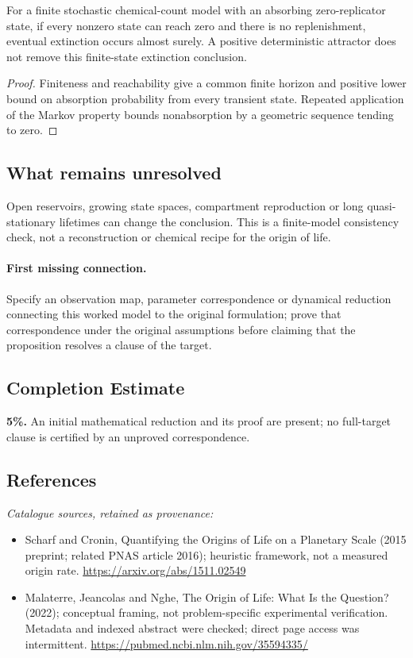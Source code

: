 \documentclass[11pt]{article}
\begin{document}
\begin{proposition}
For a finite stochastic chemical-count model with an absorbing zero-replicator state, if every nonzero state can reach zero and there is no replenishment, eventual extinction occurs almost surely. A positive deterministic attractor does not remove this finite-state extinction conclusion.
\end{proposition}
\begin{proof}
Finiteness and reachability give a common finite horizon and positive lower bound on absorption probability from every transient state. Repeated application of the Markov property bounds nonabsorption by a geometric sequence tending to zero.
\end{proof}
\subsection{What remains unresolved}
Open reservoirs, growing state spaces, compartment reproduction or long quasi-stationary lifetimes can change the conclusion. This is a finite-model consistency check, not a reconstruction or chemical recipe for the origin of life.
\paragraph{First missing connection.} Specify an observation map, parameter correspondence or dynamical reduction connecting this worked model to the original formulation; prove that correspondence under the original assumptions before claiming that the proposition resolves a clause of the target.
\subsection{Completion Estimate}
\textbf{5\%.} An initial mathematical reduction and its proof are present; no full-target clause is certified by an unproved correspondence.
\subsection{References}
\noindent\emph{Catalogue sources, retained as provenance:}
\begin{itemize}
\item Scharf and Cronin, Quantifying the Origins of Life on a Planetary Scale (2015 preprint; related PNAS article 2016); heuristic framework, not a measured origin rate. \url{https://arxiv.org/abs/1511.02549}
\item Malaterre, Jeancolas and Nghe, The Origin of Life: What Is the Question? (2022); conceptual framing, not problem-specific experimental verification. Metadata and indexed abstract were checked; direct page access was intermittent. \url{https://pubmed.ncbi.nlm.nih.gov/35594335/}
\end{itemize}
\end{document}
